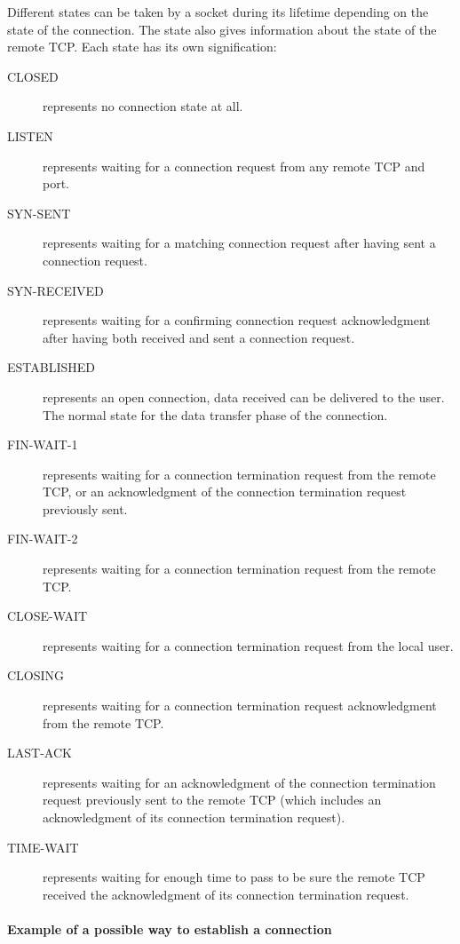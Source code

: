 \documentclass[a4paper, 10pt]{article}
\let\state\textsf
\newcommand\ESTABLISHED{\state{ESTABLISHED}}
\newcommand\SYNRECEIVED{\state{SYN-RECEIVED}}
\newcommand\CLOSED{\state{CLOSED}}
\newcommand\CLOSEWAIT{\state{CLOSE-WAIT}}
\newcommand\LISTEN{\state{LISTEN}}
\newcommand\SYNSENT{\state{SYN-SENT}}
\newcommand\FINWAITONE{\state{FIN-WAIT-1}}
\newcommand\FINWAITTWO{\state{FIN-WAIT-2}}
\newcommand\CLOSING{\state{CLOSING}}
\newcommand\LASTACK{\state{LAST-ACK}}
\newcommand\TIMEWAIT{\state{TIME-WAIT}}
\begin{document}
    Different states can be taken by a socket during its lifetime depending on the state
    of the connection. The state also gives information about the state of the remote TCP.
    Each state has its own signification:
    \begin{description}
        \item[\CLOSED] represents no connection state at all.
        \item[\LISTEN] represents waiting for a connection request from any remote
        TCP and port.
        \item[\SYNSENT] represents waiting for a matching connection request
        after having sent a connection request.
        \item[\SYNRECEIVED] represents waiting for a confirming connection
        request acknowledgment after having both received and sent a
        connection request.
        \item[\ESTABLISHED] represents an open connection, data received can be
        delivered to the user. The normal state for the data transfer phase
        of the connection.
        \item[\FINWAITONE{}] represents waiting for a connection termination request
        from the remote TCP, or an acknowledgment of the connection
        termination request previously sent.
        \item[\FINWAITTWO{}] represents waiting for a connection termination request
        from the remote TCP.
        \item[\CLOSEWAIT] represents waiting for a connection termination request
        from the local user.
        \item[\CLOSING{}] represents waiting for a connection termination request
        acknowledgment from the remote TCP.
        \item[\LASTACK{}] represents waiting for an acknowledgment of the
        connection termination request previously sent to the remote TCP
        (which includes an acknowledgment of its connection termination
        request).
        \item[\TIMEWAIT{}] represents waiting for enough time to pass to be sure
        the remote TCP received the acknowledgment of its connection
        termination request.
    \end{description}

    \paragraph{Example of a possible way to establish a connection}
\end{document}
